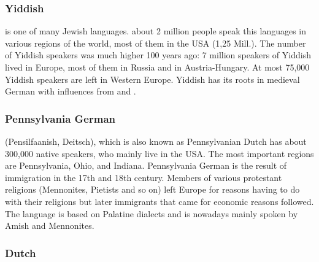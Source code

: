 


\subsubsection{Yiddish}

 is one of many Jewish languages. about 2 million people speak this languages in various
regions of the world, most of them in the USA (1,25 Mill.). The number of Yiddish speakers was much
higher 100 years ago: 7 million speakers of Yiddish lived in Europe, most of them in Russia and in
Austria-Hungary. At most 75,000 Yiddish speakers are left in Western Europe. Yiddish has its roots
in medieval German with influences from  and .




\subsubsection{Pennsylvania German}

 (Pensilfaanish, Deitsch), which is also known as Pennsylvanian Dutch has about 300,000
native speakers, who mainly live in the USA. The most important regions are Pennsylvania, Ohio, and
Indiana. Pennsylvania German is the result of immigration in the 17th and 18th century. Members of
various protestant religions (Mennonites, Pietists and so on) left Europe for reasons having to do
with their religions but later immigrants that came for economic reasons followed.  The language is
based on Palatine dialects and is nowadays mainly spoken by Amish and Mennonites.




\subsubsection{Dutch}

